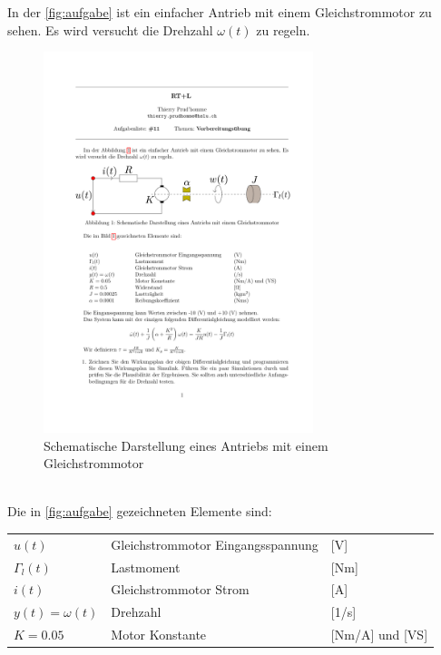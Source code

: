 \begin{aufgabe}
    In der \autoref{fig:aufgabe} ist ein einfacher Antrieb mit einem 
    Gleichstrommotor zu sehen. Es wird versucht die Drehzahl $\omega(t)$ zu 
    regeln.
    \begin{figure}[h!]
        \centering
        \includegraphics[page=1, width=0.7\textwidth, trim=70 470 50 250, clip=true]
            {aufgabe/RTL_VorbereitungUebung.pdf}
        \caption{Schematische Darstellung eines Antriebs mit einem Gleichstrommotor}
        \label{fig:aufgabe}
    \end{figure}
    \\
    Die in \autoref{fig:aufgabe} gezeichneten Elemente sind: \\
    \begin{tabular}{@{}lll}
        $u(t)$              & Gleichstrommotor Eingangsspannung & [V] \\
        $\Gamma_l(t)$       & Lastmoment                        & [Nm] \\
        $i(t)$              & Gleichstrommotor Strom            & [A] \\
        $y(t) = \omega(t)$  & Drehzahl                          & [1/s] \\
        $K = 0.05$          & Motor Konstante                   & [Nm/A] und [VS] \\

\end{tabular}
\end{aufgabe}
